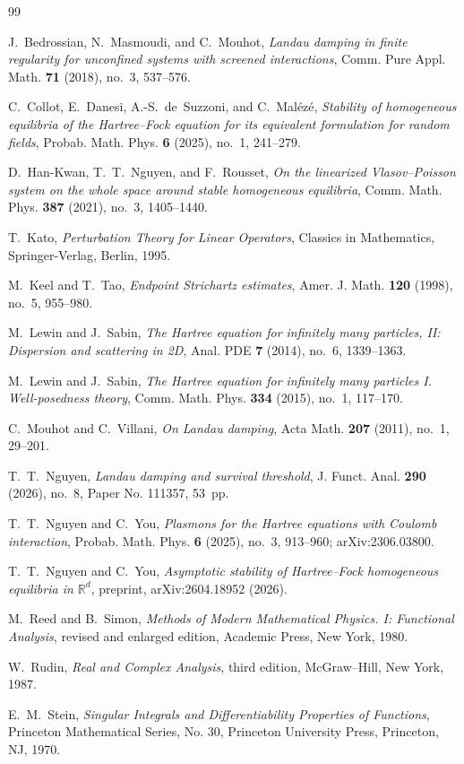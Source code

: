 \documentclass[11pt,a4paper]{amsart}
\theoremstyle{definition}
\theoremstyle{remark}
\begin{document}
\begin{thebibliography}{99}

 J.~Bedrossian, N.~Masmoudi, and C.~Mouhot,
\emph{Landau damping in finite regularity for unconfined systems with screened interactions},
Comm. Pure Appl. Math. \textbf{71} (2018), no.~3, 537--576.

 C.~Collot, E.~Danesi, A.-S.~de~Suzzoni, and C.~Mal\'ez\'e,
\emph{Stability of homogeneous equilibria of the Hartree--Fock equation for its equivalent formulation for random fields},
Probab. Math. Phys. \textbf{6} (2025), no.~1, 241--279.

 D.~Han-Kwan, T.~T.~Nguyen, and F.~Rousset,
\emph{On the linearized Vlasov--Poisson system on the whole space around stable homogeneous equilibria},
Comm. Math. Phys. \textbf{387} (2021), no.~3, 1405--1440.

 T.~Kato,
\emph{Perturbation Theory for Linear Operators},
Classics in Mathematics, Springer-Verlag, Berlin, 1995.

 M.~Keel and T.~Tao,
\emph{Endpoint Strichartz estimates},
Amer. J. Math. \textbf{120} (1998), no.~5, 955--980.

 M.~Lewin and J.~Sabin,
\emph{The Hartree equation for infinitely many particles, II: Dispersion and scattering in 2D},
Anal. PDE \textbf{7} (2014), no.~6, 1339--1363.

 M.~Lewin and J.~Sabin,
\emph{The Hartree equation for infinitely many particles I. Well-posedness theory},
Comm. Math. Phys. \textbf{334} (2015), no.~1, 117--170.

 C.~Mouhot and C.~Villani,
\emph{On Landau damping},
Acta Math. \textbf{207} (2011), no.~1, 29--201.

 T.~T.~Nguyen,
\emph{Landau damping and survival threshold},
J. Funct. Anal. \textbf{290} (2026), no.~8, Paper No. 111357, 53~pp.

 T.~T.~Nguyen and C.~You,
\emph{Plasmons for the Hartree equations with Coulomb interaction},
Probab. Math. Phys. \textbf{6} (2025), no.~3, 913--960; arXiv:2306.03800.

 T.~T.~Nguyen and C.~You,
\emph{Asymptotic stability of Hartree--Fock homogeneous equilibria in $\mathbb{R}^d$},
preprint, arXiv:2604.18952 (2026).

 M.~Reed and B.~Simon,
\emph{Methods of Modern Mathematical Physics. I: Functional Analysis},
revised and enlarged edition, Academic Press, New York, 1980.

 W.~Rudin,
\emph{Real and Complex Analysis},
third edition, McGraw--Hill, New York, 1987.

 E.~M.~Stein,
\emph{Singular Integrals and Differentiability Properties of Functions},
Princeton Mathematical Series, No. 30, Princeton University Press, Princeton, NJ, 1970.

\end{thebibliography}
\end{document}
